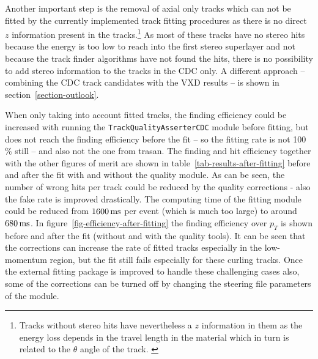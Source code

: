 Another important step is the removal of axial only tracks which can not be fitted by the currently implemented track fitting procedures as there is no direct $z$ information present in the tracks.\footnote{Tracks without stereo hits have nevertheless a $z$ information in them as the energy loss depends in the travel length in the material which in turn is related to the $\theta$ angle of the track. \cite{martin}} As most of these tracks have no stereo hits because the energy is too low to reach into the first stereo superlayer and not because the track finder algorithms have not found the hits, there is no possibility to add stereo information to the tracks in the CDC only. A different approach -- combining the CDC track candidates with the VXD results -- is shown in section~\ref{section-outlook}.

When only taking into account fitted tracks, the finding efficiency could be increased with running the \texttt{Track\-Quality\-Asserter\-CDC} module before fitting, but does not reach the finding efficiency before the fit -- so the fitting rate is not 100 \% still -- and also not the one from trasan. The finding and hit efficiency together with the other figures of merit are shown in table~\ref{tab-results-after-fitting} before and after the fit with and without the quality module. As can be seen, the number of wrong hits per track could be reduced by the quality corrections - also the fake rate is improved drastically. The computing time of the fitting module could be reduced from $\unit[1600]{ms}$ per event (which is much too large) to around $\unit[680]{ms}$. In figure~\ref{fig-efficiency-after-fitting} the finding efficiency over $p_T$ is shown before and after the fit (without and with the quality tools). It can be seen that the corrections can increase the rate of fitted tracks especially in the low-momentum region, but the fit still fails especially for these curling tracks. Once the external fitting package is improved to handle these challenging cases also, some of the corrections can be turned off by changing the steering file parameters of the module.

